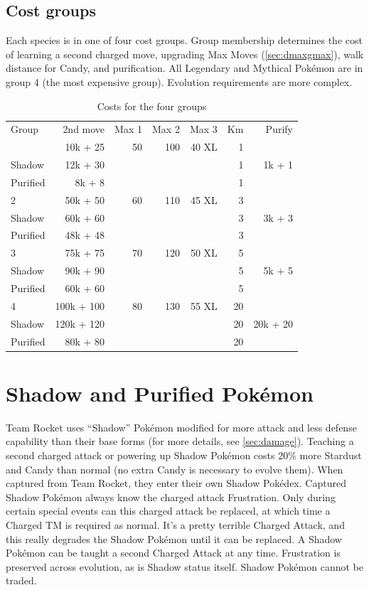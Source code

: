 \subsection{Cost groups\label{subsec:costgroups}}
Each species is in one of four cost groups.
Group membership determines the cost of
  learning a second charged move,
  upgrading Max Moves (\autoref{sec:dmaxgmax}),
  walk distance for Candy,
  and purification.
All Legendary and Mythical Pokémon are in group 4 (the most expensive group).
Evolution requirements are more complex.
\begin{table}
\centering
\footnotesize
\begin{tabular}{lrrrrrr}
  Group & 2nd move   & Max 1 & Max 2 & Max 3 & Km & Purify\\
\Midrule
      1 & 10k + 25   & 50    & 100   & 40 XL & 1  &       \\
  Shadow& 12k + 30   &       &       &       & 1  & 1k + 1\\
Purified& 8k + 8   &       &       &       & 1  &         \\
      2 & 50k + 50   & 60    & 110   & 45 XL & 3  &       \\
  Shadow& 60k + 60   &       &       &       & 3  & 3k + 3\\
  Purified& 48k + 48   &       &       &       & 3  &     \\
      3 & 75k + 75   & 70    & 120   & 50 XL & 5  &       \\
  Shadow& 90k + 90   &       &       &       & 5  & 5k + 5\\
  Purified & 60k + 60 &   &    &   & 5 &                  \\
      4 & 100k + 100 & 80    & 130   & 55 XL & 20 &       \\
  Shadow& 120k + 120 &       &       &       & 20 & 20k + 20\\
Purified& 80k + 80 &   &    &   & 20 & \\
\end{tabular}
  \caption{Costs for the four groups\label{table:costs}}
\end{table}

\section{Shadow and Purified Pokémon\label{sec:shadow}}
Team Rocket uses ``Shadow'' Pokémon modified for more attack
 and less defense capability than their base forms (for more details,
 see \autoref{sec:damage}).
Teaching a second charged attack or powering up Shadow Pokémon costs 20\% more Stardust and Candy than normal
 (no extra Candy is necessary to evolve them).
When captured from Team Rocket, they enter their own Shadow Pokédex.
Captured Shadow Pokémon always know the charged attack Frustration.
Only during certain special events can this charged attack be replaced,
 at which time a Charged TM is required as normal.
It's a pretty terrible Charged Attack, and this really degrades the
 Shadow Pokémon until it can be replaced.
A Shadow Pokémon can be taught a second Charged Attack at any time.
Frustration is preserved across evolution, as is Shadow status itself.
Shadow Pokémon cannot be traded.

